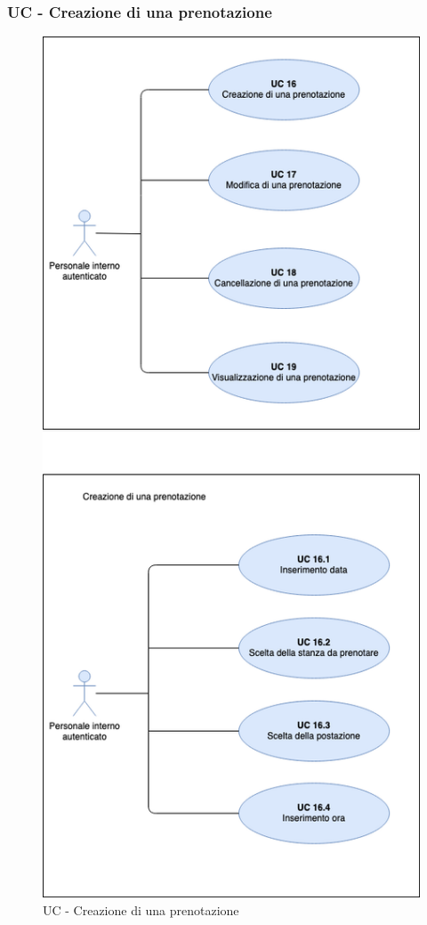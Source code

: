 \subsubsection{UC - Creazione di una prenotazione}

\begin{figure}[h]
  \centering
    \includegraphics[scale=0.5]{src/CasiDUso/Immagini/UC-creazionePrenotazione.png}
  \caption{UC  - Creazione di una prenotazione}
\end{figure}

